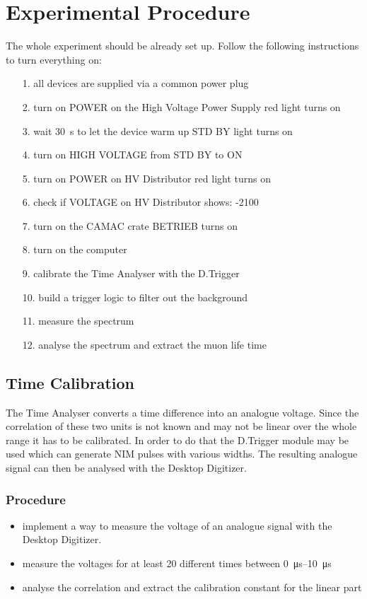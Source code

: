 \section{Experimental Procedure}

The whole experiment should be already set up. Follow the following instructions to turn everything on:
\begin{itemize}
 \item[1.] all devices are supplied via a common power plug
 \item[2.] turn on  POWER on the High Voltage Power Supply \ra red light turns on
 \item[3.] wait \SI{30}{\second} to let the device warm up \ra STD BY light turns on
 \item[4.] turn on HIGH VOLTAGE from STD BY to ON
 \item[5.] turn on POWER on HV Distributor \ra red light turns on
 \item[6.] check if VOLTAGE on HV Distributor shows: -2100
 \item[7.] turn on the CAMAC crate \ra BETRIEB turns on
 \item[8.] turn on the computer
 \item[9.] calibrate the Time Analyser with the D.Trigger
 \item[10.] build a trigger logic to filter out the background
 \item[11.] measure the spectrum
 \item[12.] analyse the spectrum and extract the muon life time
\end{itemize}

\subsection{Time Calibration}
The Time Analyser converts a time difference into an analogue voltage. Since the correlation of these two units is not known and may not be linear over the whole range it has to be calibrated. In order to do that the D.Trigger module may be used which can generate NIM pulses with various widths. The resulting analogue signal can then be analysed with the Desktop Digitizer. 

\subsubsection*{Procedure}
\begin{itemize}
	\item implement a way to measure the voltage of an analogue signal with the Desktop Digitizer.
	\item measure the voltages for at least 20 different times between \SIrange{0}{10}{\micro\second}
	\item analyse the correlation and extract the calibration constant for the linear part
\end{itemize}








